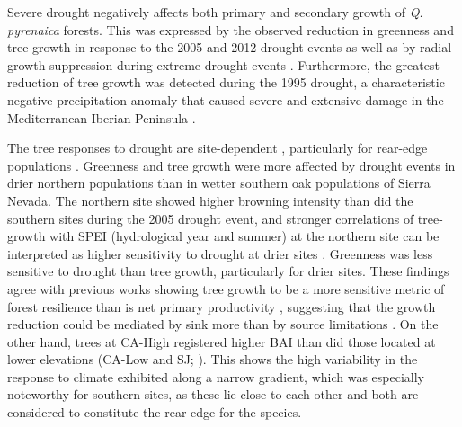 Severe drought negatively affects both primary and secondary growth of \emph{Q. pyrenaica} forests. This was expressed by the observed reduction in greenness and tree growth in response to the 2005 and 2012 drought events as well as by radial-growth suppression during extreme drought events \autocite{Corcueraetal2006RadialgrowthWoodanatomical,GeaIzquierdoCanellas2014LocalClimate}. Furthermore, the greatest reduction of tree growth was detected during the 1995 drought, a characteristic negative precipitation anomaly that caused severe and extensive damage in the Mediterranean Iberian Peninsula \autocite{Penuelasetal2001SevereDrought,Gazoletal2018ForestResilience}.

The tree responses to drought are site-dependent \autocite{Babstetal2013SiteSpecies}, particularly for rear-edge populations \autocite{CavinJump2017HighestDrought,DoradoLinanetal2017LargescaleAtmospheric}. Greenness and tree growth were more affected by drought events in drier northern populations than in wetter southern oak populations of Sierra Nevada. The northern site showed higher browning intensity than did the southern sites during the 2005 drought event, and stronger correlations of tree-growth with SPEI (hydrological year and summer) at the northern site can be interpreted as higher sensitivity to drought at drier sites \autocite{GeaIzquierdoCanellas2014LocalClimate}. Greenness was less sensitive to drought than tree growth, particularly for drier sites. These findings agree with previous works showing tree growth to be a more sensitive metric of forest resilience than is net primary productivity \autocites[\emph{e.g.}][]{Babstetal2013SiteSpecies,Coulthardetal2017TreeGrowth,Gazoletal2018ForestResilience,PenaGallardoetal2018DroughtSensitiveness}, suggesting that the growth reduction could be mediated by sink more than by source limitations \autocite{Korner2013GrowthControls,Fatichietal2014MovingPhotosynthesis}. On the other hand, trees at CA-High registered higher BAI than did those located at lower elevations (CA-Low and SJ; ). This shows the high variability in the response to climate exhibited along a narrow gradient, which was especially noteworthy for southern sites, as these lie close to each other and both are considered to constitute the rear edge for the species.

